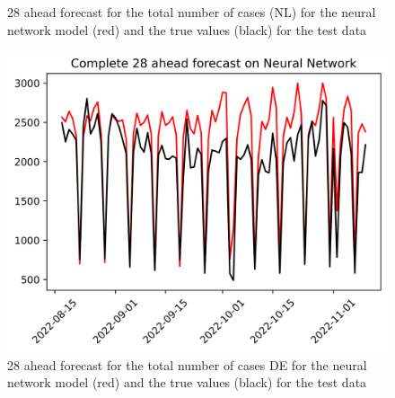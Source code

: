 \begin{figure}
\begin{minipage}{.32\textwidth}
  \caption{28 ahead forecast for the total number of cases (NL) for the neural network model (red) and the true values (black) for the test data}
  \label{fig:tot_cases_fc_28_nn}
\end{minipage}
\begin{minipage}{.32\textwidth}
  \centering
  \includegraphics[width=\linewidth]{pics/28_ah/DE_Complete_28_ahead_Neural Network.png}
  \caption{28 ahead forecast for the total number of cases DE for the neural network model (red) and the true values (black) for the test data}
  \label{fig:tot_cases_fc_28_nn_DE}
\end{minipage}

\end{figure}
